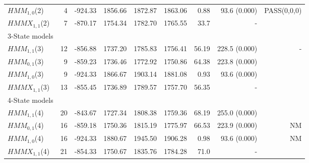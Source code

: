 \documentclass[11pt,a4paper,oneside]{article}
\begin{document}
\begin{table}[h!]
\begin{tabular}{lrrrrrrrr}
\hspace{3mm}$HMM_{1,0}$(2) &  4  & -924.33 & 1856.66 & 1872.87 & 1863.06 &   0.88 & 93.6 \small{(0.000)} & PASS(0,0,0) \\

\hspace{3mm}$HMMX_{1,1}$(2) &  7 & -870.17 & 1754.34 &  1782.70 & 1765.55 & 33.7 &  - \\

3-State models & & & & & & &  \\ 

\hspace{3mm}$HMM_{1,1}$(3) & 12 &  -856.88 &  1737.20  &  1785.83  & 1756.41 & 56.19 & 228.5 \small{(0.000)} & - \\

\hspace{3mm}$HMM_{0,1}$(3) &  9 &  -859.23 & 1736.46 & 1772.92 & 1750.86 & 64.38 & 223.8 \small{(0.000)} & \\

\hspace{3mm}$HMM_{1,0}$(3) &  9 & -924.33
 &  1866.67 & 1903.14 & 1881.08 &   0.93 & 93.6 \small{(0.000)} & \\

\hspace{3mm}$HMMX_{1,1}$(3) & 13 &  -855.45 &   1736.89 &  1789.57 &  1757.70 &   56.35 &  - \\

4-State models & & & & & & &  \\ 

\hspace{3mm}$HMM_{1,1}$(4) & 20 &  -843.67 &  1727.34  &  1808.38  &  1759.36 & 68.19 & 255.0 \small{(0.000)} \\

\hspace{3mm}$HMM_{0,1}$(4) &  16 &  -859.18
 &   1750.36  & 1815.19 & 1775.97  &  66.53 &  223.9 \small{(0.000)} & NM \\

\hspace{3mm}$HMM_{1,0}$(4) &  16 & -924.33 &  1880.67 &  1945.50 & 1906.28
 &  0.98 & 93.6 \small{(0.000)} & NM  \\

\hspace{3mm}$HMMX_{1,1}$(4) & 21 &  -854.33 & 1750.67 & 1835.76  & 1784.28
  &   71.0 &  - \\



\end{tabular}
\end{table}
\end{document}
